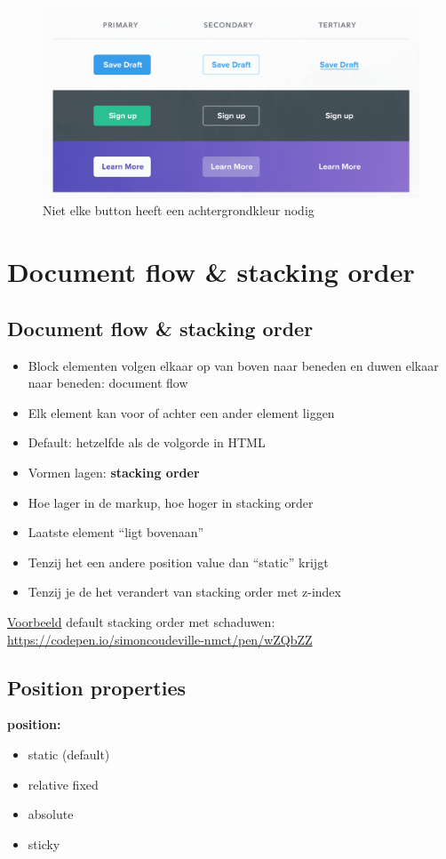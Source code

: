 \documentclass{article}
\newcommand{\bold}[1]{\textbf{#1}}
\begin{document}
\begin{figure}[H]
    \centering
    \includegraphics[width=\textwidth]{img/Screenshot_20200302_094103.png}
    \caption{Niet elke button heeft een achtergrondkleur nodig}
\end{figure}


\section{Document flow \& stacking order}
\subsection{Document flow \& stacking order}
\begin{itemize}
    \item Block elementen volgen elkaar op van boven naar beneden en duwen elkaar naar beneden: document flow
    \item Elk element kan voor of achter een ander element liggen
    \item Default: hetzelfde als de volgorde in HTML
    \item Vormen lagen: \bold{stacking order}
    \item Hoe lager in de markup, hoe hoger in stacking order
    \item Laatste element “ligt bovenaan”
    \item Tenzij het een andere position value dan “static” krijgt
    \item Tenzij je de het verandert van stacking order met z-index
\end{itemize}

\underline{Voorbeeld} default stacking order met schaduwen: \url{https://codepen.io/simoncoudeville-nmct/pen/wZQbZZ}

\subsection{Position properties}
\bold{position:}
\begin{itemize}
    \item static (default)
    \item relative fixed
    \item absolute
    \item sticky
\end{itemize}
\end{document}
